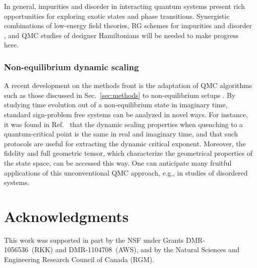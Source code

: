 \documentclass[range]{ar2e}
\begin{document}
In general, impurities and disorder in interacting quantum systems present rich opportunities for exploring exotic states and phase transitions.
Synergistic combinations of low-energy field theories, RG schemes for impurities \cite{Vojta12} and disorder \cite{Hoyos08,Vojta10,Altman10,Iyer12}, 
and QMC studies of designer Hamiltonians will be needed to make progress here.

\subsubsection{Non-equilibrium dynamic scaling}

A recent development on the methods front is the adaptation of QMC algorithms such as those discussed in Sec.~\ref{sec:methods} to non-equilibrium 
setups \cite{Degrandi11}. By studying time evolution out of a non-equilibrium state in imaginary time, standard sign-problem free systems
can be analyzed in novel ways. For instance, it was found in Ref.~\cite{Degrandi11} that the dynamic scaling properties when quenching to
a quantum-critical point is the same in real and imaginary time, and that such protocols are useful for extracting the dynamic critical
exponent. Moreover, the fidelity and full geometric tensor, which characterize the geometrical properties of the state space, can be
accessed this way. One can anticipate many fruitful applications of this unconventional QMC approach, e.g., in studies of disordered systems.

\section*{Acknowledgments}

This work was supported in part by the NSF under Grants DMR-1056536~(RKK) and DMR-1104708~(AWS), and by the Natural Sciences and Engineering Research Council of Canada (RGM).



\end{document}
